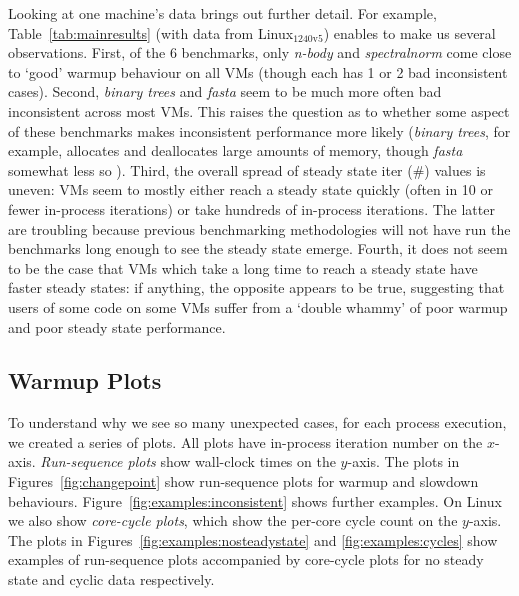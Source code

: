 \documentclass[acmlarge]{acmart}\settopmatter{printfolios=true}
\newcommand{\binarytrees}{\emph{binary trees}\xspace}
\newcommand{\spectralnorm}{\emph{spectralnorm}\xspace}
\newcommand{\nbody}{\emph{n-body}\xspace}
\newcommand{\fasta}{\emph{fasta}\xspace}
\newcommand{\bencherseven}{Linux$_\mathrm{1240v5}$\xspace}
\begin{document}
Looking at one machine's data brings out further detail. For
example, Table~\ref{tab:mainresults} (with data from \bencherseven)
enables to make us several observations. First, of the 6 benchmarks, only \nbody and \spectralnorm
come close to `good' warmup behaviour on all VMs (though each has 1 or 2 bad
inconsistent cases). Second, \binarytrees and \fasta seem to be much more often
bad inconsistent across most VMs. This raises the question as to whether some
aspect of these benchmarks makes inconsistent performance more likely
(\binarytrees, for example, allocates and deallocates
large amounts of memory, though \fasta somewhat less so ).
Third, the overall spread of steady state iter (\#) values is uneven: VMs seem
to mostly either reach a steady state quickly (often in 10 or fewer in-process
iterations) or take hundreds of in-process iterations. The latter are troubling
because previous benchmarking methodologies
will not have run the benchmarks long enough to see the steady state emerge.
Fourth, it does not seem to be the case that VMs which take a long
time to reach a steady state have faster steady states: if anything,
the opposite appears to be true, suggesting that users of some code
on some VMs suffer from a `double whammy' of poor warmup and poor
steady state performance.


\subsection{Warmup Plots}

To understand why we see so many unexpected cases, for each process execution,
we created a series of plots. All plots have in-process iteration number on the
$x$-axis. \emph{Run-sequence plots} show wall-clock times on the $y$-axis. The
plots in Figures~\ref{fig:changepoint} show run-sequence plots for warmup and
slowdown behaviours. Figure~\ref{fig:examples:inconsistent} shows further
examples. On Linux we also show \emph{core-cycle plots}, which show the
per-core cycle count on the $y$-axis. The plots in
Figures~\ref{fig:examples:nosteadystate} and \ref{fig:examples:cycles} show
examples of run-sequence plots accompanied by core-cycle plots for no steady
state and cyclic data respectively.
\end{document}
